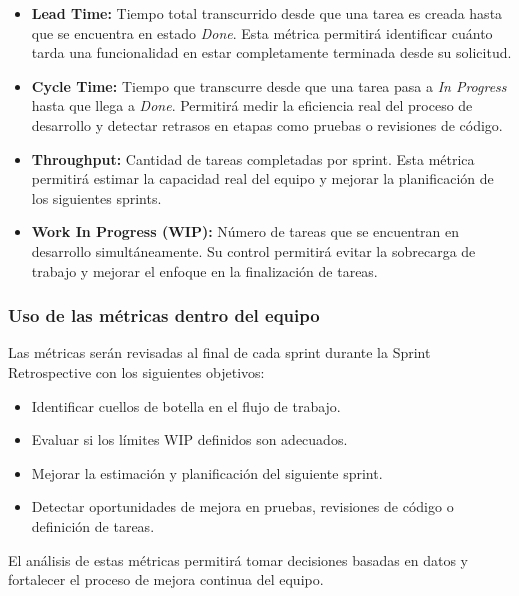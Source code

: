 \documentclass[12pt]{article}
\begin{document}
\begin{itemize}
    \item \textbf{Lead Time:}  
    Tiempo total transcurrido desde que una tarea es creada hasta que se encuentra en estado \textit{Done}.  
    Esta métrica permitirá identificar cuánto tarda una funcionalidad en estar completamente terminada desde su solicitud.

    \item \textbf{Cycle Time:}  
    Tiempo que transcurre desde que una tarea pasa a \textit{In Progress} hasta que llega a \textit{Done}.  
    Permitirá medir la eficiencia real del proceso de desarrollo y detectar retrasos en etapas como pruebas o revisiones de código.

    \item \textbf{Throughput:}  
    Cantidad de tareas completadas por sprint.  
    Esta métrica permitirá estimar la capacidad real del equipo y mejorar la planificación de los siguientes sprints.

    \item \textbf{Work In Progress (WIP):}  
    Número de tareas que se encuentran en desarrollo simultáneamente.  
    Su control permitirá evitar la sobrecarga de trabajo y mejorar el enfoque en la finalización de tareas.
\end{itemize}

\subsubsection{Uso de las métricas dentro del equipo}

Las métricas serán revisadas al final de cada sprint durante la Sprint Retrospective con los siguientes objetivos:

\begin{itemize}
    \item Identificar cuellos de botella en el flujo de trabajo.
    \item Evaluar si los límites WIP definidos son adecuados.
    \item Mejorar la estimación y planificación del siguiente sprint.
    \item Detectar oportunidades de mejora en pruebas, revisiones de código o definición de tareas.
\end{itemize}

El análisis de estas métricas permitirá tomar decisiones basadas en datos y fortalecer el proceso de mejora continua del equipo.

\end{document}
